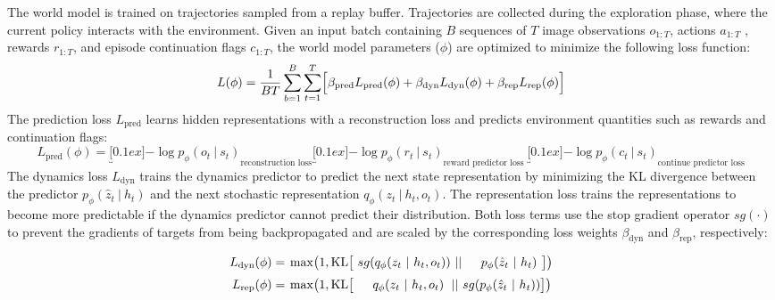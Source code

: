 The world model is trained on trajectories sampled from a replay buffer. Trajectories are collected during the exploration phase, where the current policy interacts with the environment. Given an input batch containing $B$ sequences of $T$ image observations $o_{1:T}$, actions $a_{1:T}$ , rewards $r_{1:T}$, and episode continuation flags $c_{1:T}$, the world model parameters ($\phi$) are optimized to minimize the following loss function:
\begin{equation}
L(\phi) = \frac{1}{BT}\sum_{b=1}^{B}\sum_{t=1}^{T}\Bigr[\beta_{\text{pred}}L_{\text{pred}}(\phi) + \beta_{\text{dyn}}L_{\text{dyn}}(\phi) + \beta_{\text{rep}}L_{\text{rep}}(\phi)\Bigl]
\end{equation}
The prediction loss $L_{\text{pred}}$ learns hidden representations with a reconstruction loss and predicts environment quantities such as rewards and continuation flags:
\begin{equation}
L_{\text{pred}}(\phi) = \underbracket[0.1ex]{-\log p_{\phi}(o_{t}\ |\ s_{t})}_{\text{reconstruction loss}} \underbracket[0.1ex]{-\log p_{\phi}(r_{t}\ |\ s_{t})}_{\text{reward predictor loss}}\ \underbracket[0.1ex]{-\log p_{\phi}(c_{t}\ |\ s_{t})}_{\text{continue predictor loss}}
\end{equation}
The dynamics loss $L_{\text{dyn}}$ trains the dynamics predictor to predict the next state representation by minimizing the KL divergence between the predictor $p_{\phi}(\hat{z}_{t}\ |\ h_{t})$ and the next stochastic representation $q_{\phi}(z_{t}\ |\ h_{t}, o_{t})$. The representation loss trains the representations to become more predictable if the dynamics predictor cannot predict their distribution. Both loss terms use the stop gradient operator $sg(\cdot)$ to prevent the gradients of targets from being backpropagated and are scaled by the corresponding loss weights $\beta_{\text{dyn}}$ and $\beta_{\text{rep}}$, respectively:
\begin{equation}
\setlength{\tabcolsep}{2pt}
\renewcommand{\arraystretch}{1.5}
\begin{tabular}{rll}
$L_{\text{dyn}}(\phi)=$ & $\max\bigl(1, \text{KL}\bigl[\ sg( q_{\phi}(z_{t}\ |\ h_{t}, o_{t}))\ ||\hspace{3.6ex}p_{\phi}(\hat{z}_{t}\ |\ h_{t})\hspace{0.87ex}\bigr]\bigr)$ \\
$L_{\text{rep}}(\phi)=$ & $\max\bigl(1, \text{KL}\bigl[\hspace{3.6ex}q_{\phi}(z_{t}\ |\ h_{t}, o_{t})\hspace{1.42ex} ||\  sg(  p_{\phi}(\hat{z}_{t}\ |\ h_{t}) )\bigr]\bigr)$
\end{tabular}
\end{equation}

